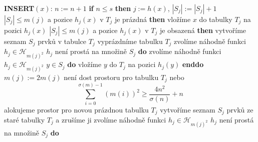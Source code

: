\documentclass[a4paper,12pt]{article}
\begin{document}
{\bf INSERT$(x)$}: \newline 
$n:=n+1$ \newline 
{\bf if} $n\le s$ {\bf then}\newline 
\phantom{---}$j:=h(x)$, $|S_j|:=|S_j|+1$\newline 
\phantom{---}{\bf if} $|S_j|\le m(j)$ a pozice $h_j(x)$ v $T_j$ je prázdná {\bf then}\newline 
\phantom{------}vložíme $x$ do tabulky $T_j$  na pozici $
h_j(x)$\newline 
\phantom{---}{\bf else}\newline 
\phantom{------}{\bf if} $|S_j|\le m(j)$ a pozice $h_j(x)$ v $T_
j$ je obsazená {\bf then}\newline 
\phantom{---------}vytvoříme seznam $S_j$ prvků v tabulce $
T_j$\newline 
\phantom{---------}vyprázdníme tabulku $T_j$\newline 
\phantom{---------}zvolíme náhodně funkci $h_j\in \mathcal H_{
m(j)^2}$\newline 
\phantom{---------}{\bf while} $h_j$ není prostá na množině $
S_j$ {\bf do}\newline 
\phantom{------------}zvolíme náhodně funkci $h_j
\in \mathcal H_{m(j)^2}$\newline 
\phantom{---------}{\bf enddo}\newline 
\phantom{---------}{\bf for every} $y\in S_j$ {\bf do} vložíme $
y$ do $T_j$ na pozici $h_j(y)$ {\bf enddo}\newline 
\phantom{------}{\bf else}\newline 
\phantom{---------}$m(j):=2m(j)$\newline 
\phantom{---------}{\bf if} není dost prostoru pro tabulku $
T_j$ nebo 
$$\sum_{i=0}^{\sigma (m)-1}(m(i))^2\ge\frac {4n^2}{\sigma (n)}+n$$
\phantom{---------}{\bf then}\newline 
\phantom{------------}{\bf RehashAll}\newline 
\phantom{---------}{\bf else}\newline 
\phantom{------------}alokujeme prostor pro novou prázdnou tabulku $
T_j$ \newline 
\phantom{------------}vytvoříme seznam $S_j$ prvků ze staré tabulky $
T_j$ a zrušíme ji\newline 
\phantom{------------}zvolíme náhodně funkci $h_j\in \mathcal H_{
m(j)^2}$\newline 
\phantom{------------}{\bf while} $h_j$ není prostá na množině $
S_j$ {\bf do}\newline 
\end{document}
